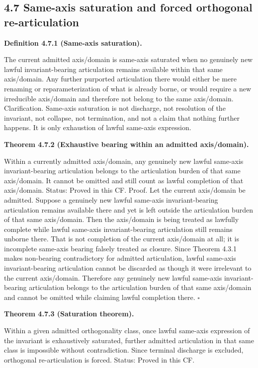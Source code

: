 \documentclass[11pt]{article}
\begin{document}
\subsection{4.7 Same-axis saturation and forced orthogonal re-articulation}\label{same-axis-saturation-and-forced-orthogonal-re-articulation}

\textbf{Definition 4.7.1 (Same-axis saturation).}

The current admitted axis/domain is same-axis saturated when no genuinely new lawful invariant-bearing articulation remains available within that same axis/domain. Any further purported articulation there would either be mere renaming or reparameterization of what is already borne, or would require a new irreducible axis/domain and therefore not belong to the same axis/domain. Clarification. Same-axis saturation is not discharge, not resolution of the invariant, not collapse, not termination, and not a claim that nothing further happens. It is only exhaustion of lawful same-axis expression.

\textbf{Theorem 4.7.2 (Exhaustive bearing within an admitted axis/domain).}

Within a currently admitted axis/domain, any genuinely new lawful same-axis invariant-bearing articulation belongs to the articulation burden of that same axis/domain. It cannot be omitted and still count as lawful completion of that axis/domain. Status: Proved in this CF. Proof. Let the current axis/domain be admitted. Suppose a genuinely new lawful same-axis invariant-bearing articulation remains available there and yet is left outside the articulation burden of that same axis/domain. Then the axis/domain is being treated as lawfully complete while lawful same-axis invariant-bearing articulation still remains unborne there. That is not completion of the current axis/domain at all; it is incomplete same-axis bearing falsely treated as closure. Since Theorem 4.3.1 makes non-bearing contradictory for admitted articulation, lawful same-axis invariant-bearing articulation cannot be discarded as though it were irrelevant to the current axis/domain. Therefore any genuinely new lawful same-axis invariant-bearing articulation belongs to the articulation burden of that same axis/domain and cannot be omitted while claiming lawful completion there. $\square$

\textbf{Theorem 4.7.3 (Saturation theorem).}

Within a given admitted orthogonality class, once lawful same-axis expression of the invariant is exhaustively saturated, further admitted articulation in that same class is impossible without contradiction. Since terminal discharge is excluded, orthogonal re-articulation is forced. Status: Proved in this CF.
\end{document}
